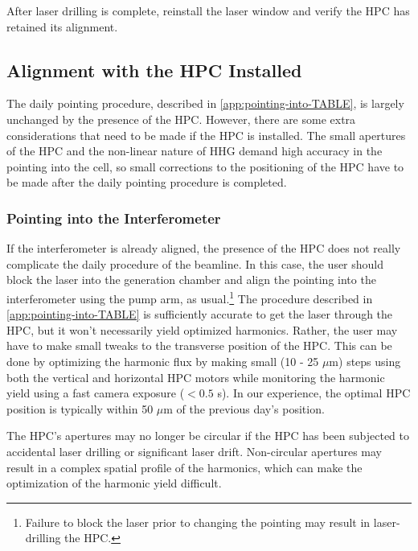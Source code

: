 After laser drilling is complete, reinstall the laser window and verify the HPC has retained its alignment.



\subsection{Alignment with the HPC Installed}

The daily pointing procedure, described in \ref{app:pointing-into-TABLE}, is largely unchanged by the presence of the HPC. However, there are some extra considerations that need to be made if the HPC is installed. The small apertures of the HPC and the non-linear nature of HHG demand high accuracy in the pointing into the cell, so small corrections to the positioning of the HPC have to be made after the daily pointing procedure is completed.

\subsubsection{Pointing into the Interferometer}
If the interferometer is already aligned, the presence of the HPC does not really complicate the daily procedure of the beamline. In this case, the user should block the laser into the generation chamber and align the pointing into the interferometer using the pump arm, as usual.\footnote{Failure to block the laser prior to changing the pointing may result in laser-drilling the HPC.} The procedure described in \ref{app:pointing-into-TABLE} is sufficiently accurate to get the laser through the HPC, but it won't necessarily yield optimized harmonics. Rather, the user may have to make small tweaks to the transverse position of the HPC. This can be done by optimizing the harmonic flux by making small (10 - 25 $\mu$m) steps using both the vertical and horizontal HPC motors while monitoring the harmonic yield using a fast camera exposure ($< 0.5$ s). In our experience, the optimal HPC position is typically within 50 $\mu$m of the previous day's position.

The HPC's apertures may no longer be circular if the HPC has been subjected to accidental laser drilling or significant laser drift. Non-circular apertures may result in a complex spatial profile of the harmonics, which can make the optimization of the harmonic yield difficult.

